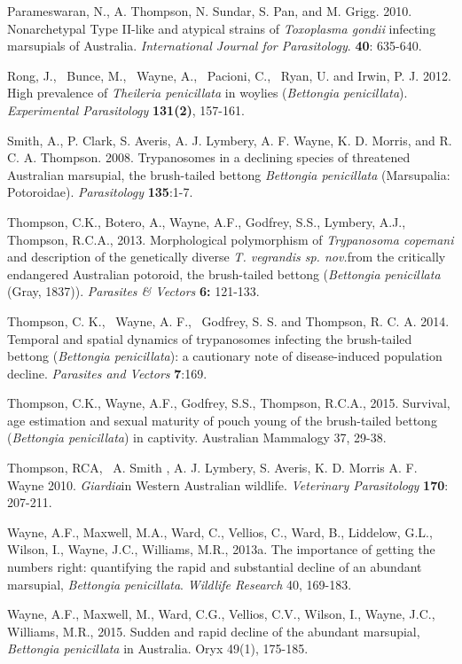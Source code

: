 \documentclass[version=last,
    paper=a4,                               %
    10pt,                                   %
    dvipsnames,
    oneside,                              %
    headings=openany,                       %
    open=any,
    BCOR=7mm,                               %
    DIV=15,     %
]{scrbook}
\begin{document}
Parameswaran, N., A. Thompson, N. Sundar, S. Pan, and M. Grigg. 2010.
Nonarchetypal Type II-like and atypical strains of \emph{Toxoplasma
gondii} infecting marsupials of Australia. \emph{International Journal
for Parasitology}. \textbf{40}: 635-640.

Rong, J.,~ Bunce, M.,~ Wayne, A.,~ Pacioni, C.,~ Ryan, U. and Irwin, P.
J. 2012. High prevalence of \emph{Theileria penicillata} in woylies
(\emph{Bettongia penicillata}). \emph{Experimental Parasitology}
\textbf{131(2)}, 157-161.

Smith, A., P. Clark, S. Averis, A. J. Lymbery, A. F. Wayne, K. D.
Morris, and R. C. A. Thompson. 2008. Trypanosomes in a declining species
of threatened Australian marsupial, the brush-tailed bettong
\emph{Bettongia penicillata} (Marsupalia: Potoroidae).
\emph{Parasitology} \textbf{135}:1-7.

Thompson, C.K., Botero, A., Wayne, A.F., Godfrey, S.S., Lymbery, A.J.,
Thompson, R.C.A., 2013. Morphological polymorphism of \emph{Trypanosoma
copemani} and description of the genetically diverse \emph{T. vegrandis
sp. nov.}from the critically endangered Australian potoroid, the
brush-tailed bettong (\emph{Bettongia penicillata} (Gray, 1837)).
\emph{Parasites \& Vectors} \textbf{6:} 121-133.

Thompson, C. K.,~ Wayne, A. F.,~ Godfrey, S. S. and Thompson, R. C. A.
2014. Temporal and spatial dynamics of trypanosomes infecting the
brush-tailed bettong (\emph{Bettongia penicillata}): a cautionary note
of disease-induced population decline. \emph{Parasites and Vectors}
\textbf{7}:169.

Thompson, C.K., Wayne, A.F., Godfrey, S.S., Thompson, R.C.A., 2015.
Survival, age estimation and sexual maturity of pouch young of the
brush-tailed bettong (\emph{Bettongia penicillata}) in captivity.
Australian Mammalogy 37, 29-38.

Thompson, RCA,~ A. Smith , A. J. Lymbery, S. Averis, K. D. Morris A. F.
Wayne 2010. \emph{Giardia}in Western Australian wildlife.
\emph{Veterinary Parasitology} \textbf{170}: 207-211.

Wayne, A.F., Maxwell, M.A., Ward, C., Vellios, C., Ward, B., Liddelow,
G.L., Wilson, I., Wayne, J.C., Williams, M.R., 2013a. The importance of
getting the numbers right: quantifying the rapid and substantial decline
of an abundant marsupial, \emph{Bettongia penicillata}. \emph{Wildlife
Research} 40, 169-183.

Wayne, A.F., Maxwell, M., Ward, C.G., Vellios, C.V., Wilson, I., Wayne,
J.C., Williams, M.R., 2015. Sudden and rapid decline of the abundant
marsupial, \emph{Bettongia penicillata} in Australia. Oryx 49(1),
175-185.
\end{document}
